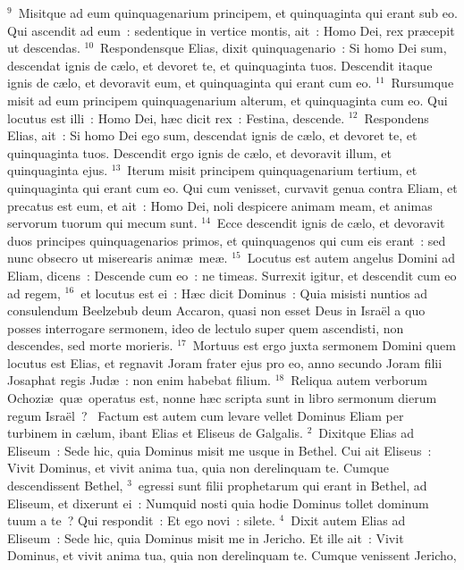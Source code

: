 ${}^{9}$~Misitque ad eum quinquagenarium principem, et quinquaginta qui erant sub eo. Qui ascendit ad eum~: sedentique in vertice montis, ait~: Homo Dei, rex pr\ae cepit ut descendas.
${}^{10}$~Respondensque Elias, dixit quinquagenario~: Si homo Dei sum, descendat ignis de c\ae lo, et devoret te, et quinquaginta tuos. Descendit itaque ignis de c\ae lo, et devoravit eum, et quinquaginta qui erant cum eo.
${}^{11}$~Rursumque misit ad eum principem quinquagenarium alterum, et quinquaginta cum eo. Qui locutus est illi~: Homo Dei, h\ae c dicit rex~: Festina, descende.
${}^{12}$~Respondens Elias, ait~: Si homo Dei ego sum, descendat ignis de c\ae lo, et devoret te, et quinquaginta tuos. Descendit ergo ignis de c\ae lo, et devoravit illum, et quinquaginta ejus.
${}^{13}$~Iterum misit principem quinquagenarium tertium, et quinquaginta qui erant cum eo. Qui cum venisset, curvavit genua contra Eliam, et precatus est eum, et ait~: Homo Dei, noli despicere animam meam, et animas servorum tuorum qui mecum sunt.
${}^{14}$~Ecce descendit ignis de c\ae lo, et devoravit duos principes quinquagenarios primos, et quinquagenos qui cum eis erant~: sed nunc obsecro ut miserearis anim\ae\ me\ae .
${}^{15}$~Locutus est autem angelus Domini ad Eliam, dicens~: Descende cum eo~: ne timeas. Surrexit igitur, et descendit cum eo ad regem,
${}^{16}$~et locutus est ei~: H\ae c dicit Dominus~: Quia misisti nuntios ad consulendum Beelzebub deum Accaron, quasi non esset Deus in Isra\"el a quo posses interrogare sermonem, ideo de lectulo super quem ascendisti, non descendes, sed morte morieris.
${}^{17}$~Mortuus est ergo juxta sermonem Domini quem locutus est Elias, et regnavit Joram frater ejus pro eo, anno secundo Joram filii Josaphat regis Jud\ae~: non enim habebat filium.
${}^{18}$~Reliqua autem verborum Ochozi\ae\ qu\ae\ operatus est, nonne h\ae c scripta sunt in libro sermonum dierum regum Isra\"el~?
~\lettrine[lines=10,image=true,loversize=0.05,lraise=-0.03]{F}{}actum est autem cum levare vellet Dominus Eliam per turbinem in c\ae lum, ibant Elias et Eliseus de Galgalis.
${}^{2}$~Dixitque Elias ad Eliseum~: Sede hic, quia Dominus misit me usque in Bethel. Cui ait Eliseus~: Vivit Dominus, et vivit anima tua, quia non derelinquam te. Cumque descendissent Bethel,
${}^{3}$~egressi sunt filii prophetarum qui erant in Bethel, ad Eliseum, et dixerunt ei~: Numquid nosti quia hodie Dominus tollet dominum tuum a te~? Qui respondit~: Et ego novi~: silete.
${}^{4}$~Dixit autem Elias ad Eliseum~: Sede hic, quia Dominus misit me in Jericho. Et ille ait~: Vivit Dominus, et vivit anima tua, quia non derelinquam te. Cumque venissent Jericho,
